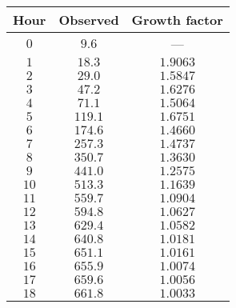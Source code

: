 \begin{tabular}{ccc}               \toprule
Hour  & Observed & Growth factor \\\midrule
$0$   & $9.6$    & ---           \\
$1$   & $18.3$   & $1.9063$      \\
$2$   & $29.0$   & $1.5847$      \\
$3$   & $47.2$   & $1.6276$      \\
$4$   & $71.1$   & $1.5064$      \\
$5$   & $119.1$  & $1.6751$      \\
$6$   & $174.6$  & $1.4660$      \\
$7$   & $257.3$  & $1.4737$      \\
$8$   & $350.7$  & $1.3630$      \\
$9$   & $441.0$  & $1.2575$      \\
$10$  & $513.3$  & $1.1639$      \\
$11$  & $559.7$  & $1.0904$      \\
$12$  & $594.8$  & $1.0627$      \\
$13$  & $629.4$  & $1.0582$      \\
$14$  & $640.8$  & $1.0181$      \\
$15$  & $651.1$  & $1.0161$      \\
$16$  & $655.9$  & $1.0074$      \\
$17$  & $659.6$  & $1.0056$      \\
$18$  & $661.8$  & $1.0033$      \\\bottomrule
\end{tabular}
